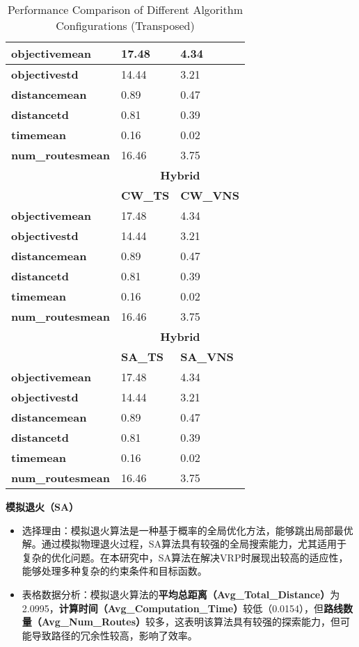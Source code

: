 \documentclass[12pt,a4paper,twoside]{ctexbook}
\begin{document}
\begin{table}[ht]
\begin{tabular}{|l|l|l|}
\textbf{objectivemean} & 17.48 & 4.34 \\ \hline
\textbf{objectivestd} & 14.44 & 3.21 \\ \hline
\textbf{distancemean} & 0.89 & 0.47 \\ \hline
\textbf{distancetd} & 0.81 & 0.39 \\ \hline
\textbf{timemean} & 0.16 & 0.02 \\ \hline
\textbf{num\_routesmean} & 16.46 & 3.75 \\ \hline
\multicolumn{1}{|c|}{\multirow{2}{*}{}} & \multicolumn{2}{c|}{\textbf{Hybrid}} \\ \cline{2-3}
\multicolumn{1}{|c|}{} & \textbf{CW\_TS} & \textbf{CW\_VNS} \\ \hline
\textbf{objectivemean} & 17.48 & 4.34 \\ \hline
\textbf{objectivestd} & 14.44 & 3.21 \\ \hline
\textbf{distancemean} & 0.89 & 0.47 \\ \hline
\textbf{distancetd} & 0.81 & 0.39 \\ \hline
\textbf{timemean} & 0.16 & 0.02 \\ \hline
\textbf{num\_routesmean} & 16.46 & 3.75 \\ \hline
\multicolumn{1}{|c|}{\multirow{2}{*}{}} & \multicolumn{2}{c|}{\textbf{Hybrid}} \\ \cline{2-3}
\multicolumn{1}{|c|}{} & \textbf{SA\_TS} & \textbf{SA\_VNS} \\ \hline
\textbf{objectivemean} & 17.48 & 4.34 \\ \hline
\textbf{objectivestd} & 14.44 & 3.21 \\ \hline
\textbf{distancemean} & 0.89 & 0.47 \\ \hline
\textbf{distancetd} & 0.81 & 0.39 \\ \hline
\textbf{timemean} & 0.16 & 0.02 \\ \hline
\textbf{num\_routesmean} & 16.46 & 3.75 \\ \hline
\end{tabular}
\caption{Performance Comparison of Different Algorithm Configurations (Transposed)}
\label{tab:algorithm_comparison_transposed}
\end{table}


\textbf{模拟退火（SA）}

\begin{itemize}
    \item 选择理由：模拟退火算法是一种基于概率的全局优化方法，能够跳出局部最优解。通过模拟物理退火过程，SA算法具有较强的全局搜索能力，尤其适用于复杂的优化问题。在本研究中，SA算法在解决VRP时展现出较高的适应性，能够处理多种复杂的约束条件和目标函数。
    \item 表格数据分析：模拟退火算法的\textbf{平均总距离（Avg\_Total\_Distance）}为2.0995，\textbf{计算时间（Avg\_Computation\_Time）}较低（0.0154），但\textbf{路线数量（Avg\_Num\_Routes）}较多，这表明该算法具有较强的探索能力，但可能导致路径的冗余性较高，影响了效率。
\end{itemize}
\end{document}
